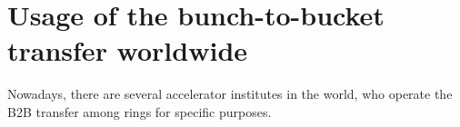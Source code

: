 %
\section{Usage of the bunch-to-bucket transfer worldwide}
Nowadays, there are several accelerator institutes in the world, who operate the B2B transfer among rings for specific purposes. 
